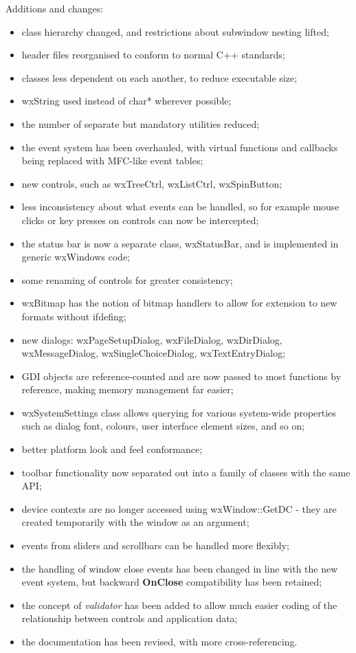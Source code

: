 Additions and changes:

\begin{itemize}\itemsep=0pt
\item class hierarchy changed, and restrictions about subwindow nesting lifted;
\item header files reorganised to conform to normal C++ standards;
\item classes less dependent on each another, to reduce executable size;
\item wxString used instead of char* wherever possible;
\item the number of separate but mandatory utilities reduced;
\item the event system has been overhauled, with
virtual functions and callbacks being replaced with MFC-like event tables;
\item new controls, such as wxTreeCtrl, wxListCtrl, wxSpinButton;
\item less inconsistency about what events can be handled, so for example
mouse clicks or key presses on controls can now be intercepted;
\item the status bar is now a separate class, wxStatusBar, and is
implemented in generic wxWindows code;
\item some renaming of controls for greater consistency;
\item wxBitmap has the notion of bitmap handlers to allow for extension to new formats
without ifdefing;
\item new dialogs: wxPageSetupDialog, wxFileDialog, wxDirDialog,
wxMessageDialog, wxSingleChoiceDialog, wxTextEntryDialog;
\item GDI objects are reference-counted and are now passed to most functions
by reference, making memory management far easier;
\item wxSystemSettings class allows querying for various system-wide properties
such as dialog font, colours, user interface element sizes, and so on;
\item better platform look and feel conformance;
\item toolbar functionality now separated out into a family of classes with the
same API;
\item device contexts are no longer accessed using wxWindow::GetDC - they are created
temporarily with the window as an argument;
\item events from sliders and scrollbars can be handled more flexibly;
\item the handling of window close events has been changed in line with the new
event system, but backward {\bf OnClose} compatibility has been retained;
\item the concept of {\it validator} has been added to allow much easier coding of
the relationship between controls and application data;
\item the documentation has been revised, with more cross-referencing.
\end{itemize}

